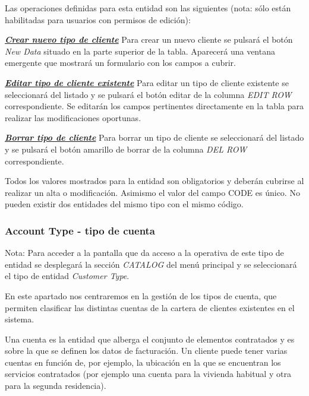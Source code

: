 Las operaciones definidas para esta entidad son las siguientes (nota: sólo están habilitadas para usuarios con permisos de edición):

\underline{\textsl{\textbf{Crear nuevo tipo de cliente}}}\newline
Para crear un nuevo cliente se pulsará el botón \textit{New Data} situado en la parte superior de la tabla. Aparecerá una ventana emergente que mostrará un formulario con los campos a cubrir.

\underline{\textsl{\textbf{Editar tipo de cliente existente}}}\newline
Para editar un tipo de cliente existente se seleccionará del listado y se pulsará el botón editar de la columna \textit{EDIT ROW} correspondiente. Se editarán los campos pertinentes directamente en la tabla para realizar las modificaciones oportunas. 

\underline{\textsl{\textbf{Borrar tipo de cliente}}}\newline
Para borrar un tipo de cliente se seleccionará del listado y se pulsará el botón amarillo de borrar de la columna \textit{DEL ROW} correspondiente.\newline

Todos los valores mostrados para la entidad son obligatorios y deberán cubrirse al realizar un alta o modificación. Asimismo el valor del campo CODE es único. No pueden existir dos entidades del mismo tipo con el mismo código.




\subsubsection{Account Type - tipo de cuenta}
\label{sub:account-type}

Nota: Para acceder a la pantalla que da acceso a la operativa de este tipo de entidad se desplegará la sección \emph{CATALOG} del menú principal y se seleccionará el tipo de entidad \emph{Customer Type}.

En este apartado nos centraremos en la gestión de los tipos de cuenta, que permiten clasificar las distintas cuentas de la cartera de clientes existentes en el sistema.

Una cuenta es la entidad que alberga el conjunto de elementos contratados y es sobre la que se definen los datos de facturación. Un cliente puede tener varias cuentas en función de, por ejemplo, la ubicación en la que se encuentran los servicios contratados (por ejemplo una cuenta para la vivienda habitual y otra para la segunda residencia). 



